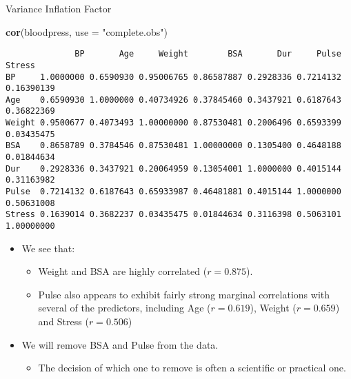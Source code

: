 \documentclass[
  ignorenonframetext,
]{beamer}
\newenvironment{Shaded}{\begin{snugshade}}{\end{snugshade}}
\newcommand{\AttributeTok}[1]{\textcolor[rgb]{0.13,0.29,0.53}{#1}}
\newcommand{\FunctionTok}[1]{\textcolor[rgb]{0.13,0.29,0.53}{\textbf{#1}}}
\newcommand{\NormalTok}[1]{#1}
\newcommand{\StringTok}[1]{\textcolor[rgb]{0.31,0.60,0.02}{#1}}
\providecommand{\tightlist}{%
  \setlength{\itemsep}{0pt}\setlength{\parskip}{0pt}}
\begin{document}
\begin{frame}[fragile]{Variance Inflation Factor}
\protect\hypertarget{variance-inflation-factor-2}{}
\tiny

\begin{Shaded}
\begin{Highlighting}[]
\FunctionTok{cor}\NormalTok{(bloodpress, }\AttributeTok{use =} \StringTok{"complete.obs"}\NormalTok{)}
\end{Highlighting}
\end{Shaded}

\begin{verbatim}
              BP       Age     Weight        BSA       Dur     Pulse     Stress
BP     1.0000000 0.6590930 0.95006765 0.86587887 0.2928336 0.7214132 0.16390139
Age    0.6590930 1.0000000 0.40734926 0.37845460 0.3437921 0.6187643 0.36822369
Weight 0.9500677 0.4073493 1.00000000 0.87530481 0.2006496 0.6593399 0.03435475
BSA    0.8658789 0.3784546 0.87530481 1.00000000 0.1305400 0.4648188 0.01844634
Dur    0.2928336 0.3437921 0.20064959 0.13054001 1.0000000 0.4015144 0.31163982
Pulse  0.7214132 0.6187643 0.65933987 0.46481881 0.4015144 1.0000000 0.50631008
Stress 0.1639014 0.3682237 0.03435475 0.01844634 0.3116398 0.5063101 1.00000000
\end{verbatim}

\normalsize

\begin{itemize}
\item
  We see that:

  \begin{itemize}
  \tightlist
  \item
    Weight and BSA are highly correlated (\(r= 0.875\)).
  \item
    Pulse also appears to exhibit fairly strong marginal correlations
    with several of the predictors, including Age (\(r = 0.619\)),
    Weight (\(r = 0.659\)) and Stress (\(r = 0.506\))
  \end{itemize}
\item
  We will remove BSA and Pulse from the data.

  \begin{itemize}
  \tightlist
  \item
    The decision of which one to remove is often a scientific or
    practical one.
  \end{itemize}
\end{itemize}
\end{frame}
\end{document}
